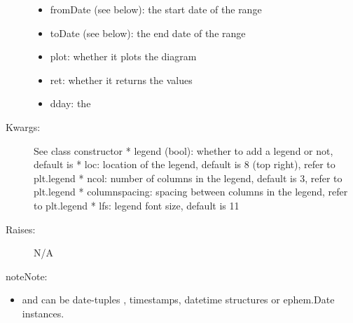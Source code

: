 \documentclass[letterpaper,10pt,english]{sphinxmanual}
\begin{document}
\begin{fulllineitems}
\begin{fulllineitems}
\begin{description}
\begin{itemize}
\item {} 
fromDate (see below): the start date of the range

\item {} 
toDate (see below): the end date of the range

\item {} 
plot: whether it plots the diagram

\item {} 
ret: whether it returns the values

\item {} 
dday: the

\end{itemize}

\item[{Kwargs:}] \leavevmode
See class constructor
* legend (bool): whether to add a legend or not, default is 
* loc: location of the legend, default is 8 (top right), refer to plt.legend
* ncol: number of columns in the legend, default is 3, refer to plt.legend
* columnspacing: spacing between columns in the legend, refer to plt.legend
* lfs: legend font size, default is 11

\item[{Raises:}] \leavevmode
N/A

\end{description}

\begin{notice}{note}{Note:}\begin{itemize}
\item {} 
 and  can be date-tuples , timestamps, datetime structures or ephem.Date instances.

\end{itemize}
\end{notice}

\end{fulllineitems}


\end{fulllineitems}

\end{document}
